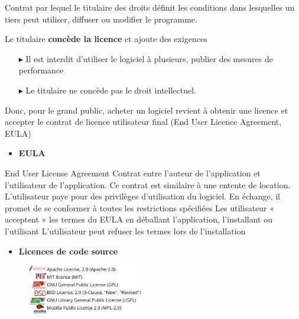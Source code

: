 \documentclass[16pt]{report}
\begin{document}
\begin{multicols*}{2}
    \begin{Definitionx}{}{}
        Contrat par lequel le \textcolor{myb}{titulaire des droits} définit les conditions dans lesquelles 
        un tiers peut utiliser, diffuser ou modifier le programme. 
    \end{Definitionx}

    \begin{note}{}{}
        Le titulaire \textbf{concède la licence} et ajoute des exigences  
        \begin{itemize}
            \item[$\blacktriangleright$] Il est interdit d'utiliser le logiciel à plusieurs, 
                publier des mesures de performance
            \item[$\blacktriangleright$] Le titulaire ne concède pas le droit intellectuel. 
        \end{itemize}
    \end{note}

    Donc, pour le grand public, acheter un logiciel revient à obtenir une licence et accepter le contrat de licence 
    utilisateur final (End User Licence Agreement, EULA)


    \begin{itemize}
        \item \textbf{EULA}  
    \end{itemize}


    \begin{Definitionx}{End User License Agreement}{}
        Contrat entre l’auteur de l’application et l’utilisateur de l’application. 
        Ce contrat est similaire à une entente de location. L'utilisateur paye pour des privilèges 
        d’utilisation du logiciel. En échange, il promet de se conformer à toutes les restrictions spécifiées 
        Les utilisateur « acceptent » les termes du EULA en déballant l’application, l’installant ou l’utilisant
        L'utilisateur peut refuser les termes lors de l’installation
    \end{Definitionx}


    \begin{itemize}
        \item \textbf{Licences de code source}
    \end{itemize}


    \begin{figure}[H]
        \begin{center}
            \includegraphics[width=0.45\textwidth]{codesourcelicence1.png}
        \end{center}
    \end{figure}
    


\end{multicols*}
\end{document}
